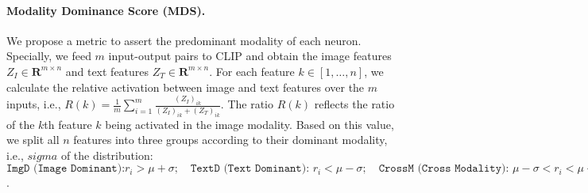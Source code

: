 \paragraph{Modality Dominance  Score (MDS).} 
We propose a metric to assert the predominant modality of each neuron. Specially, we feed $m$ input-output pairs to CLIP and obtain the image features $Z_{I}\in \mathbf{R}^{m \times n}$ and text features $Z_{T}\in \mathbf{R}^{m\times n}$. For each feature $k\in[1,\dots,n]$, we calculate the relative activation between image and text features over the $m$ inputs, i.e.,
$R(k)=\frac{1}{m}\sum_{i=1}^m\frac{(Z_I)_{ik}}{(Z_I)_{ik}+(Z_T)_{ik}}.$
The ratio $R(k)$ reflects the ratio of the $k$th feature $k$ being activated in the image modality. Based on this value, we split all $n$ features into three groups according to their dominant modality, i.e., $sigma$ of the distribution: 
 $\texttt{ImgD (Image Dominant):}  r_{i} > \mu+\sigma;\quad \texttt{TextD (Text Dominant): } r_{i} <\mu-\sigma;\quad \texttt{CrossM (Cross Modality): } \mu-\sigma <r_{i} <\mu+\sigma$.

